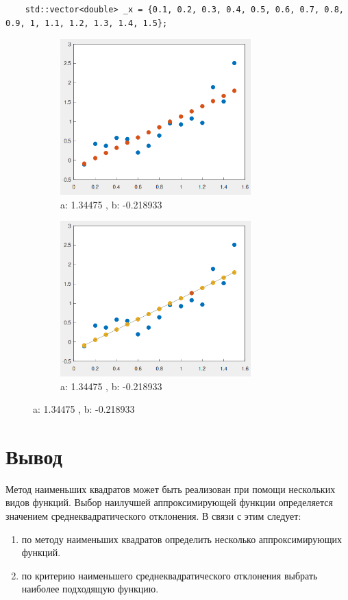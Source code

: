 \begin{verbatim}
    std::vector<double> _x = {0.1, 0.2, 0.3, 0.4, 0.5, 0.6, 0.7, 0.8, 0.9, 1, 1.1, 1.2, 1.3, 1.4, 1.5};
\end{verbatim}
\begin{figure}[h]
    \begin{subfigure}{0.5\textwidth}
        \includegraphics[width=0.9\linewidth, height=6cm]{img/graphic_3}
        \caption{a: 1.34475 , b: -0.218933}
    \end{subfigure}
    \begin{subfigure}{0.5\textwidth}
        \includegraphics[width=0.9\linewidth, height=6cm]{img/graphic_4}
        \caption{a: 1.34475 , b: -0.218933}
    \end{subfigure}
\end{figure}

\section{Вывод}
Метод наименьших квадратов может быть реализован при помощи нескольких видов функций. Выбор наилучшей аппроксимирующей функции определяется значением
среднеквадратического отклонения. В связи с этим следует:
\begin{enumerate}
    \item по методу наименьших квадратов определить несколько аппроксимирующих функций.
    \item по критерию наименьшего среднеквадратического отклонения выбрать наиболее подходящую функцию.
\end{enumerate}

